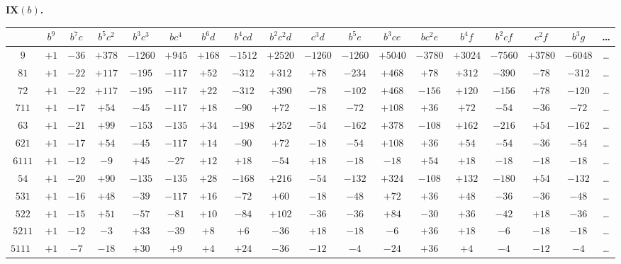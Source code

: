 \documentclass[11pt,a4paper]{book}
\begin{document}
\noindent\textbf{IX$(b)$.}
\begin{center}
\tiny
\begin{tabular}{c|c|c|c|c|c|c|c|c|c|c|c|c|c|c|c|c|c}
& $b^9$ & $b^7c$ & $b^5c^2$ & $b^3c^3$ & $bc^4$ & $b^6d$ & $b^4cd$ & $b^2c^2d$ & $c^3d$ & $b^5e$ & $b^3ce$ & $bc^2e$ & $b^4f$ & $b^2cf$ & $c^2f$ & $b^3g$ & \dots \\
\hline
$9$ & $+1$ & $-36$ & $+378$ & $-1260$ & $+945$ & $+168$ & $-1512$ & $+2520$ & $-1260$ & $-1260$ & $+5040$ & $-3780$ & $+3024$ & $-7560$ & $+3780$ & $-6048$ & \dots \\
$81$ & $+1$ & $-22$ & $+117$ & $-195$ & $-117$ & $+52$ & $-312$ & $+312$ & $+78$ & $-234$ & $+468$ & $+78$ & $+312$ & $-390$ & $-78$ & $-312$ & \dots \\
$72$ & $+1$ & $-22$ & $+117$ & $-195$ & $-117$ & $+22$ & $-312$ & $+390$ & $-78$ & $-102$ & $+468$ & $-156$ & $+120$ & $-156$ & $+78$ & $-120$ & \dots \\
$711$ & $+1$ & $-17$ & $+54$ & $-45$ & $-117$ & $+18$ & $-90$ & $+72$ & $-18$ & $-72$ & $+108$ & $+36$ & $+72$ & $-54$ & $-36$ & $-72$ & \dots \\
$63$ & $+1$ & $-21$ & $+99$ & $-153$ & $-135$ & $+34$ & $-198$ & $+252$ & $-54$ & $-162$ & $+378$ & $-108$ & $+162$ & $-216$ & $+54$ & $-162$ & \dots \\
$621$ & $+1$ & $-17$ & $+54$ & $-45$ & $-117$ & $+14$ & $-90$ & $+72$ & $-18$ & $-54$ & $+108$ & $+36$ & $+54$ & $-54$ & $-36$ & $-54$ & \dots \\
$6111$ & $+1$ & $-12$ & $-9$ & $+45$ & $-27$ & $+12$ & $+18$ & $-54$ & $+18$ & $-18$ & $-18$ & $+54$ & $+18$ & $-18$ & $-18$ & $-18$ & \dots \\
$54$ & $+1$ & $-20$ & $+90$ & $-135$ & $-135$ & $+28$ & $-168$ & $+216$ & $-54$ & $-132$ & $+324$ & $-108$ & $+132$ & $-180$ & $+54$ & $-132$ & \dots \\
$531$ & $+1$ & $-16$ & $+48$ & $-39$ & $-117$ & $+16$ & $-72$ & $+60$ & $-18$ & $-48$ & $+72$ & $+36$ & $+48$ & $-36$ & $-36$ & $-48$ & \dots \\
$522$ & $+1$ & $-15$ & $+51$ & $-57$ & $-81$ & $+10$ & $-84$ & $+102$ & $-36$ & $-36$ & $+84$ & $-30$ & $+36$ & $-42$ & $+18$ & $-36$ & \dots \\
$5211$ & $+1$ & $-12$ & $-3$ & $+33$ & $-39$ & $+8$ & $+6$ & $-36$ & $+18$ & $-18$ & $-6$ & $+36$ & $+18$ & $-6$ & $-18$ & $-18$ & \dots \\
$51111$ & $+1$ & $-7$ & $-18$ & $+30$ & $+9$ & $+4$ & $+24$ & $-36$ & $-12$ & $-4$ & $-24$ & $+36$ & $+4$ & $-4$ & $-12$ & $-4$ & \dots \\

\end{tabular}
\end{center}
\end{document}
